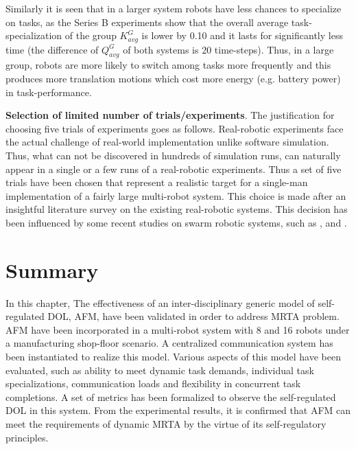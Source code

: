 Similarly it is seen that in a larger system robots have less chances to specialize on tasks, as the Series B experiments show  that the overall average task-specialization of the group $K^G_{avg}$ is lower by 0.10 and it lasts for significantly less time (the difference of $Q^G_{avg}$  of both systems is 20 time-steps). Thus, in a large group, robots are more likely to switch among tasks more frequently and this produces more translation motions which cost more energy (e.g. battery power) in task-performance.

\textbf{Selection of limited number of trials/experiments}. The justification for choosing five trials of experiments goes as follows.  Real-robotic experiments face the actual challenge of real-world implementation unlike software simulation. Thus, what can not be discovered in hundreds of simulation runs, can naturally appear in a single or a few runs of a real-robotic experiments. Thus a set of five trials have been chosen that represent a realistic target for a single-man implementation of a fairly large multi-robot system. This choice is made after an insightful literature survey on the existing real-robotic systems. This decision has been influenced by some recent studies on swarm robotic systems, such as ,  and . 
\vspace*{1cm}
\section{Summary}
\label{afm:summary}
In this chapter,  The effectiveness of an inter-disciplinary generic model of self-regulated DOL, AFM, have been validated in order to address MRTA problem. AFM have been incorporated  in a multi-robot system with 8 and 16 robots under a manufacturing shop-floor scenario. A centralized communication system has been instantiated to realize this model.  Various aspects of this model have been evaluated, such as ability to meet dynamic task demands, individual task specializations, communication loads and flexibility in concurrent task completions. A set of metrics has been formalized to observe the self-regulated DOL in this system. From the experimental results,  it is confirmed that AFM can meet the requirements of dynamic MRTA by the virtue of its self-regulatory principles.